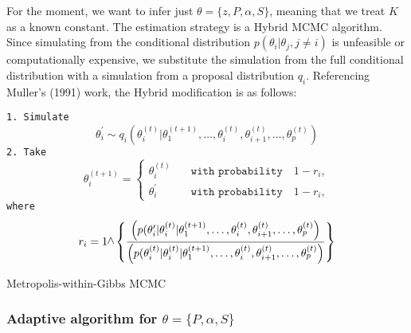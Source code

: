 \documentclass[11pt]{amsart}
\newcommand{\vertg}{\rotatebox{90}{$>$}}
\begin{document}
For the moment, we want to infer just $\theta = \{ z, P, \alpha, S \}$, meaning that we treat $K$ as a known constant. The estimation strategy is a Hybrid MCMC algorithm. Since simulating from the conditional distribution $p(\theta_i| \theta_j, j\neq i)$ is unfeasible or computationally expensive, we substitute the simulation from the full conditional distribution with a simulation from a proposal distribution $q_i$. Referencing Muller's (1991) work, the Hybrid modification is as follows:

\begin{algorithm}
\begin{algorithmic}[h]
\State \texttt{1. Simulate} \begin{equation}\label{eqn_general_proposal}
\theta_i^{\prime} \sim q_i \left(\theta_i^{(t)} | \theta_1^{(t+1)}, \dots,\theta_{i}^{(t)},\theta_{i+1}^{(t)}, \dots,\theta_{p}^{(t)} \right)
\end{equation}
\State \texttt{2. Take} \begin{equation}\label{eqn_acc_reject}
\theta_i^{(t+1)} = 
\begin{cases}
\theta_{i}^{(t)} \quad &\texttt{with probability} \quad 1 - r_i, \\
\theta_{i}^{\prime} \quad &\texttt{with probability} \quad 1 - r_i,
\end{cases}
\end{equation}
\State \texttt{where} \begin{equation}\label{eqn_gen_ratio}
r_i = 1 \vertg \left\{
\frac{\left(p(\theta_i^{\prime}|\theta_i^{(t)} | \theta_1^{(t+1)}, \dots,\theta_{i}^{(t)},\theta_{i+1}^{(t)}, \dots,\theta_{p}^{(t)}\right)}{\left(p(\theta_i^{(t)}|\theta_i^{(t)} | \theta_1^{(t+1)}, \dots,\theta_{i}^{(t)},\theta_{i+1}^{(t)}, \dots,\theta_{p}^{(t)}\right)}\right\}
\end{equation}
\EndFor
\end{algorithmic}
\label{alg_general_algortm}
\caption{Metropolis-within-Gibbs MCMC}
\end{algorithm}


\subsubsection{Adaptive algorithm for $\theta = \{ P, \alpha, S \}$}
\end{document}

